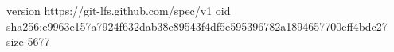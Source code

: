 version https://git-lfs.github.com/spec/v1
oid sha256:e9963e157a7924f632dab38e89543f4df5e595396782a1894657700eff4bdc27
size 5677

